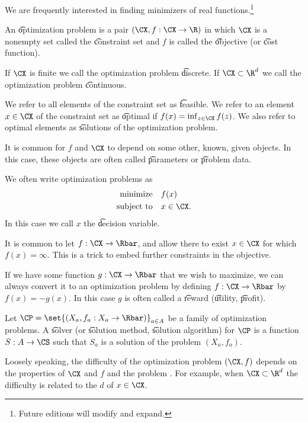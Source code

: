 

We are frequently interested in finding minimizers of real functions.\footnote{Future editions will modify and expand.}


An \t{optimization problem} is a pair $(\CX, f: \CX \to \R)$ in which $\CX$ is a nonempty set called the \t{constraint set} and $f$ is called the \t{objective} (or \t{cost function}).

If $\CX$ is finite we call the optimization problem \t{discrete}.
If $\CX \subset \R^d$ we call the optimization problem \t{continuous}.

We refer to all elements of the constraint set as \t{feasible}.
We refer to an element $x \in \CX$ of the constraint set as \t{optimal} if $f(x) = \inf_{z \in \CX}f(z)$.
We also refer to optimal elements as \t{solutions} of the optimization problem.

It is common for $f$ and $\CX$ to depend on some other, known, given objects.
In this case, these objects are often called \t{parameters} or \t{problem data}.


We often write optimization problems as
\[
  \begin{aligned}
  \text{minimize}\quad & f(x) \\
  \text{subject to}\quad & x \in \CX.
  \end{aligned}
\]
In this case we call $x$ the \t{decision variable}.


It is common to let $f: \CX \to \Rbar$, and allow there to exist $x \in \CX$ for which $f(x) = \infty$.
This is a trick to embed further constraints in the objective.


If we have some function $g: \CX \to \Rbar$ that we wish to maximize, we can always convert it to an optimization problem by defining $f: \CX \to \Rbar$ by $f(x) = -g(x)$.
In this case $g$ is often called a \t{reward} (\t{utility}, \t{profit}).


Let $\CP = \set{(X_a, f_a: X_a \to \Rbar)}_{a \in A}$ be a family of optimization problems.
A \t{solver} (or \t{solution method}, \t{solution algorithm}) for $\CP$ is a function $S: A \to \CS$ such that $S_a$ is a solution of the problem $(X_a, f_a)$.

Loosely speaking, the difficulty of  the optimization problem $(\CX, f)$ depends on the properties of $\CX$ and $f$ and the problem .
For example, when $\CX \subset \R^d$ the difficulty is related to the  $d$ of $x \in \CX$.
